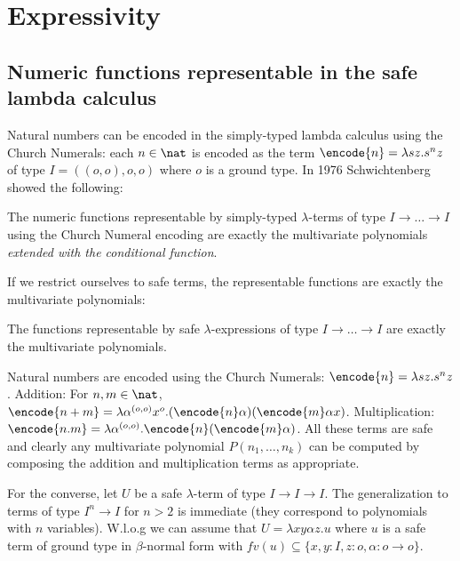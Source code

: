 \allowdisplaybreaks

\section{Expressivity}
\subsection{Numeric functions representable in the safe lambda
calculus}

Natural numbers can be encoded in the simply-typed lambda calculus
using the Church Numerals: each $n\in\nat$ is encoded as the term
$\encode{n} = \lambda s z. s^n z$ of type $I = ((o,o),o,o)$ where
$o$ is a ground type. In 1976 Schwichtenberg \cite{citeulike:622637}
showed the following:


\begin{theorem}[Schwichtenberg 1976]
The numeric functions representable by simply-typed $\lambda$-terms
of type $I\rightarrow \ldots \rightarrow I$ using the Church Numeral
encoding are exactly the multivariate polynomials \emph{extended
with the conditional function}.
\end{theorem}

If we restrict ourselves to safe terms, the representable functions
are exactly the multivariate polynomials:
\begin{theorem}
\label{thm:polychar} The functions representable by safe
$\lambda$-expressions of type $I\rightarrow \ldots \rightarrow I$
are exactly the multivariate polynomials.
\end{theorem}
\proof
  Natural numbers are encoded using the Church Numerals: $\encode{n} =
  \lambda s z. s^n z$.  Addition: For $n,m \in \nat$, $\encode{n+m} =
  \lambda \alpha^{(o,o)} x^o . (\encode{n} \alpha) (\encode{m} \alpha
  x)$. Multiplication: $\encode{n . m} = \lambda \alpha^{(o,o)}
  . \encode{n} (\encode{m} \alpha)$.  All these terms are safe and
  clearly any multivariate polynomial $P(n_1, \ldots, n_k)$ can be
  computed by composing the addition and multiplication terms as
  appropriate.

For the converse, let $U$ be a safe $\lambda$-term of type
$I\rightarrow I\rightarrow I$.  The generalization to terms of type
$I^n \rightarrow I$ for $n>2$ is immediate (they correspond to
polynomials with $n$ variables). W.l.o.g we can assume that $U =
\lambda x y \alpha z. u$ where $u$ is a safe term of ground type in
$\beta$-normal form with $fv(u) \subseteq \{ x, y : I, z :o, \alpha
: o\rightarrow o \}$.

